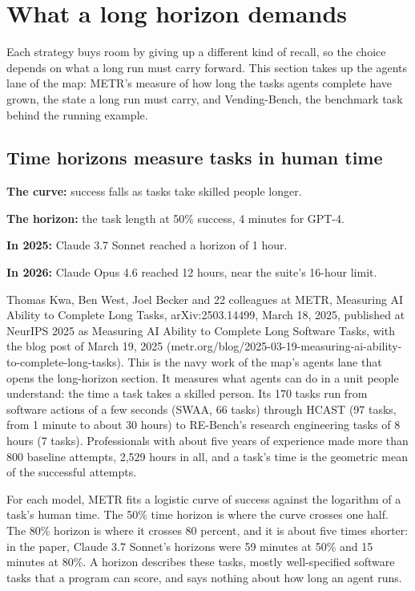 \section{What a long horizon demands}
\label{sec:row-2}

Each strategy buys room by giving up a different kind of recall, so the choice depends on what a long run must carry forward. This section takes up the agents lane of the map: METR's measure of how long the tasks agents complete have grown, the state a long run must carry, and Vending-Bench, the benchmark task behind the running example.

\subsection{Time horizons measure tasks in human time}
\label{sec:it-8-0a}

\bi
\item \textbf{The curve:} success falls as tasks take skilled people longer.
\item \textbf{The horizon:} the task length at 50\% success, 4 minutes for GPT-4.
\item \textbf{In 2025:} Claude 3.7 Sonnet reached a horizon of 1 hour.
\item \textbf{In 2026:} Claude Opus 4.6 reached 12 hours, near the suite's 16-hour limit.
\ei

Thomas Kwa, Ben West, Joel Becker and 22 colleagues at METR, Measuring AI Ability to Complete Long Tasks, arXiv:2503.14499, March 18, 2025, published at NeurIPS 2025 as Measuring AI Ability to Complete Long Software Tasks, with the blog post of March 19, 2025 (metr.org/blog/2025-03-19-measuring-ai-ability-to-complete-long-tasks). This is the navy work of the map's agents lane that opens the long-horizon section. It measures what agents can do in a unit people understand: the time a task takes a skilled person. Its 170 tasks run from software actions of a few seconds (SWAA, 66 tasks) through HCAST (97 tasks, from 1 minute to about 30 hours) to RE-Bench's research engineering tasks of 8 hours (7 tasks). Professionals with about five years of experience made more than 800 baseline attempts, 2,529 hours in all, and a task's time is the geometric mean of the successful attempts.

For each model, METR fits a logistic curve of success against the logarithm of a task's human time. The 50\% time horizon is where the curve crosses one half. The 80\% horizon is where it crosses 80 percent, and it is about five times shorter: in the paper, Claude 3.7 Sonnet's horizons were 59 minutes at 50\% and 15 minutes at 80\%. A horizon describes these tasks, mostly well-specified software tasks that a program can score, and says nothing about how long an agent runs.


